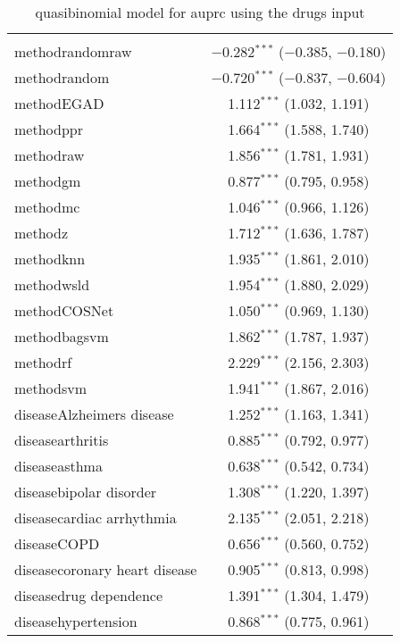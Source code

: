 
\begin{table}[!htbp] \centering 
  \caption{quasibinomial model for auprc using the drugs input} 
  \label{} 
\begin{tabular}{@{\extracolsep{5pt}}lc} 
\\[-1.8ex]\hline 
\hline \\[-1.8ex] 
 methodrandomraw & $-$0.282$^{***}$ ($-$0.385, $-$0.180) \\ 
  methodrandom & $-$0.720$^{***}$ ($-$0.837, $-$0.604) \\ 
  methodEGAD & 1.112$^{***}$ (1.032, 1.191) \\ 
  methodppr & 1.664$^{***}$ (1.588, 1.740) \\ 
  methodraw & 1.856$^{***}$ (1.781, 1.931) \\ 
  methodgm & 0.877$^{***}$ (0.795, 0.958) \\ 
  methodmc & 1.046$^{***}$ (0.966, 1.126) \\ 
  methodz & 1.712$^{***}$ (1.636, 1.787) \\ 
  methodknn & 1.935$^{***}$ (1.861, 2.010) \\ 
  methodwsld & 1.954$^{***}$ (1.880, 2.029) \\ 
  methodCOSNet & 1.050$^{***}$ (0.969, 1.130) \\ 
  methodbagsvm & 1.862$^{***}$ (1.787, 1.937) \\ 
  methodrf & 2.229$^{***}$ (2.156, 2.303) \\ 
  methodsvm & 1.941$^{***}$ (1.867, 2.016) \\ 
  diseaseAlzheimers disease & 1.252$^{***}$ (1.163, 1.341) \\ 
  diseasearthritis & 0.885$^{***}$ (0.792, 0.977) \\ 
  diseaseasthma & 0.638$^{***}$ (0.542, 0.734) \\ 
  diseasebipolar disorder & 1.308$^{***}$ (1.220, 1.397) \\ 
  diseasecardiac arrhythmia & 2.135$^{***}$ (2.051, 2.218) \\ 
  diseaseCOPD & 0.656$^{***}$ (0.560, 0.752) \\ 
  diseasecoronary heart disease & 0.905$^{***}$ (0.813, 0.998) \\ 
  diseasedrug dependence & 1.391$^{***}$ (1.304, 1.479) \\ 
  diseasehypertension & 0.868$^{***}$ (0.775, 0.961) \\ 

\end{tabular}
\end{table}
